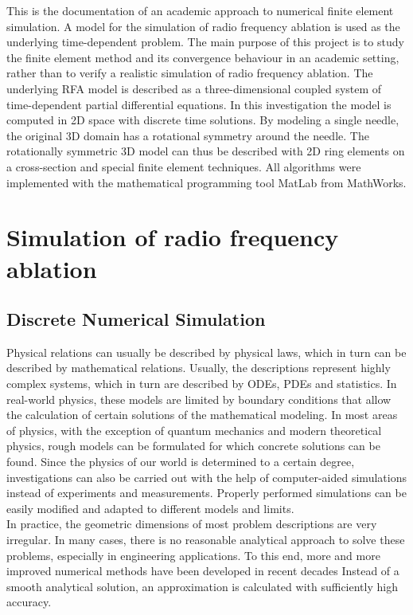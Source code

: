 \documentclass[parskip=half, titlepage=yes, 12pt, BCOR=12mm, DIV=calc]{scrartcl}
\begin{document}
This is the documentation of an academic approach to numerical finite element simulation. A model for the simulation of radio frequency ablation is used as the underlying time-dependent problem.
The main purpose of this project is to study the finite element method and its convergence behaviour in an academic setting, rather than to verify a realistic simulation of radio frequency ablation. 
The underlying RFA model is described as a three-dimensional coupled system of time-dependent partial differential equations. In this investigation the model is computed in 2D space with discrete time solutions. By modeling a single needle, the original 3D domain has a rotational symmetry around the needle. The rotationally symmetric 3D model can thus be described with 2D ring elements on a cross-section and special finite element techniques. 
All algorithms were implemented with the mathematical programming tool MatLab from MathWorks.



\section{Simulation of radio frequency ablation}

\subsection{Discrete Numerical Simulation}
Physical relations can usually be described by physical laws, which in turn can be described by mathematical relations. 
Usually, the descriptions represent highly complex systems, which in turn are described by ODEs, PDEs and statistics.
In real-world physics, these models are limited by boundary conditions that allow the calculation of certain solutions of the mathematical modeling. 
In most areas of physics, with the exception of quantum mechanics and modern theoretical physics, rough models can be formulated for which concrete solutions can be found. 
Since the physics of our world is determined to a certain degree, investigations can also be carried out with the help of computer-aided simulations instead of experiments and measurements. 
Properly performed simulations can be easily modified and adapted to different models and limits. \\

In practice, the geometric dimensions of most problem descriptions are very irregular.
In many cases, there is no reasonable analytical approach to solve these problems, especially in engineering applications.
To this end, more and more improved numerical methods have been developed in recent decades 
Instead of a smooth analytical solution, an approximation is calculated with sufficiently high accuracy.\\
\end{document}
